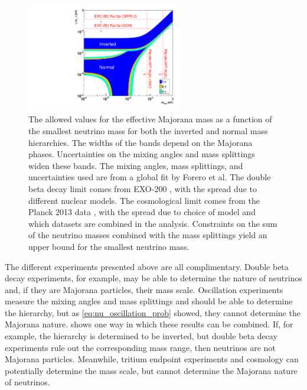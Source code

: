 \documentclass[herrin-thesis.tex]{subfiles}
\begin{document}
\begin{figure}[htp]
	\centering
	\includegraphics[width=0.6\textwidth]{./plots/nu_meff_v_mmin.pdf}
	\caption[Effective Majorana mass vs. smallest neutrino mass]{The allowed values for the effective Majorana mass as a function of the smallest neutrino mass for both the inverted and normal mass hierarchies. The widths of the bands depend on the Majorana phases. Uncertainties on the mixing angles and mass splittings widen these bands. The mixing angles, mass splittings, and uncertainties used are from a global fit by Forero et al. \cite{Forero:2012cr} The double beta decay limit comes from EXO-200 \cite{Auger:2012ar}, with the spread due to different nuclear models. The cosmological limit comes from the Planck 2013 data \cite{Ade:2013kl}, with the spread due to choice of model and which datasets are combined in the analysis. Constraints on the sum of the neutrino masses combined with the mass splittings yield an upper bound for the smallest neutrino mass.}
	\label{fig:nu_meff_v_mmin}
\end{figure}

The different experiments presented above are all complimentary. Double beta decay experiments, for example, may be able to determine the nature of neutrinos and, if they are Majorana particles, their mass scale. Oscillation experiments measure the mixing angles and mass splittings and should be able to determine the hierarchy, but as \cref{eq:nu_oscillation_prob} showed, they cannot determine the Majorana nature.  shows one way in which these results can be combined. If, for example, the hierarchy is determined to be inverted, but double beta decay experiments rule out the corresponding mass range, then neutrinos are not Majorana particles. Meanwhile, tritium endpoint experiments and cosmology can potentially determine the mass scale, but cannot determine the Majorana nature of neutrinos.
\end{document}
